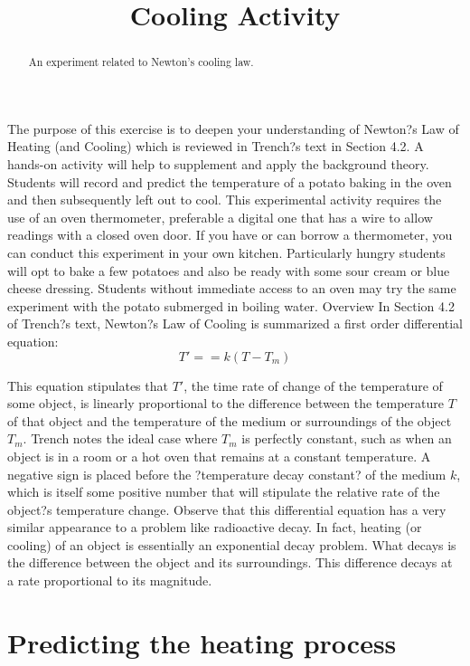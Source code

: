 \documentclass{ximera}
\title{Cooling Activity}
\begin{document}
\begin{abstract}
An experiment related to Newton's cooling law.
\end{abstract}

\maketitle

The purpose of this exercise is to deepen your understanding of Newton?s Law of Heating (and Cooling) which is reviewed in Trench?s text in Section 4.2.  A hands-on activity will help to supplement and apply the background theory.  Students will record and predict the temperature of a potato baking in the oven and then subsequently left out to cool.  This experimental activity requires the use of an oven thermometer, preferable a digital one that has a wire to allow readings with a closed oven door.  If you have or can borrow a thermometer, you can conduct this experiment in your own kitchen.  Particularly hungry students will opt to bake a few potatoes and also be ready with some sour cream or blue cheese dressing.  Students without immediate access to an oven may try the same experiment with the potato submerged in boiling water.
Overview
In Section 4.2 of Trench?s text, Newton?s Law of Cooling is summarized a first order differential equation:
\[
T'==k(T-T_m)
\]

This equation stipulates that $T'$, the time rate of change of the temperature of some object, is linearly proportional to the difference between the temperature  $T$ of that object and the temperature of the medium or surroundings of the object $T_m$.  Trench notes the ideal case where  $T_m$ is perfectly constant, such as when an object is in a room or a hot oven that remains at a constant temperature.  A negative sign is placed before the ?temperature decay constant? of the medium $k$, which is itself some positive number that will stipulate the relative rate of the object?s temperature change.  Observe that this differential equation has a very similar appearance to a problem like radioactive decay.  In fact, heating (or cooling) of an object is essentially an exponential decay problem.  What decays is the difference between the object and its surroundings.  This difference decays at a rate proportional to its magnitude.

\section*{Predicting the heating process}
\end{document}

